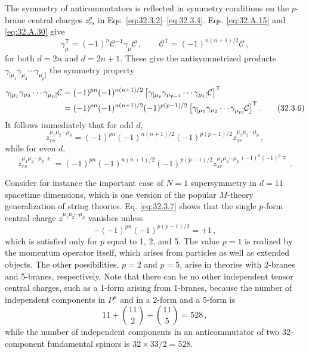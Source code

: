 The symmetry of anticommutators is reflected in symmetry conditions on
the \(p\)-brane central charges \(z_{rs}^p\) in
Eqs. \eqref{eq:32.3.2}--\eqref{eq:32.3.4}. Eqs. \eqref{eq:32.A.15} and
\eqref{eq:32.A.30} give
\begin{equation}
  \gamma_\mu^{\mathsf T}
  =(-1)^n\mathcal C^{-1}\gamma_\mu\mathcal C\,,
  \qquad
  \mathcal C^{\mathsf T}
  =(-1)^{n(n+1)/2}\mathcal C\,,
  \tag{32.3.5}\label{eq:32.3.5}
\end{equation}
for both \(d=2n\) and \(d=2n+1\). These give the antisymmetrized products
\(\gamma_{[\mu_1}\gamma_{\mu_2}\cdots\gamma_{\mu_p]}\) the symmetry
property
\begin{align}
  \gamma_{[\mu_1}\gamma_{\mu_2}\cdots\gamma_{\mu_p]}\mathcal C
  &=
  (-1)^{pn}(-1)^{n(n+1)/2}
  \left[
    \gamma_{[\mu_p}\gamma_{\mu_{p-1}}\cdots\gamma_{\mu_1]}\mathcal C
  \right]^{\mathsf T}
  \notag\\
  &=
  (-1)^{pn}(-1)^{n(n+1)/2}(-1)^{p(p-1)/2}
  \left[
    \gamma_{[\mu_1}\gamma_{\mu_2}\cdots\gamma_{\mu_p]}\mathcal C
  \right]^{\mathsf T}.
  \tag{32.3.6}\label{eq:32.3.6}
\end{align}
It follows immediately that for odd \(d\),
\begin{equation}
  z_{rs}^{\mu_1\mu_2\cdots\mu_p}
  =(-1)^{pn}(-1)^{n(n+1)/2}(-1)^{p(p-1)/2}
   z_{sr}^{\mu_1\mu_2\cdots\mu_p}\,,
  \tag{32.3.7}\label{eq:32.3.7}
\end{equation}
while for even \(d\),
\begin{equation}
  z_{rs}^{\mu_1\mu_2\cdots\mu_p\,\pm}
  =(-1)^{pn}(-1)^{n(n+1)/2}(-1)^{p(p-1)/2}
   z_{sr}^{\mu_1\mu_2\cdots\mu_p\,(-1)^n(-1)^p\mp}\,.
  \tag{32.3.8}\label{eq:32.3.8}
\end{equation}

Consider for instance the important case of \(N=1\) supersymmetry in
\(d=11\) spacetime dimensions, which is one version of the popular
\(M\)-theory generalization of string theories. Eq. \eqref{eq:32.3.7} shows that
the single \(p\)-form central charge \(z^{\mu_1\mu_2\cdots\mu_p}\)
vanishes unless
\begin{equation}
  -(-1)^{pn}(-1)^{p(p-1)/2}=+1\,,
  \tag{32.3.9}\label{eq:32.3.9}
\end{equation}
which is satisfied only for \(p\) equal to 1, 2, and 5. The value \(p=1\)
is realized by the momentum operator itself, which arises from particles
as well as extended objects. The other possibilities, \(p=2\) and
\(p=5\), arise in theories with 2-branes and 5-branes, respectively. Note
that there can be no other independent tensor central charges, such as a
1-form arising from 1-branes, because the number of independent components
in \(P^\mu\) and in a 2-form and a 5-form is
\[
  11+\binom{11}{2}+\binom{11}{5}=528\,,
\]
while the number of independent components in an anticommutator of two
32-component fundamental spinors is \(32\times33/2=528\).

